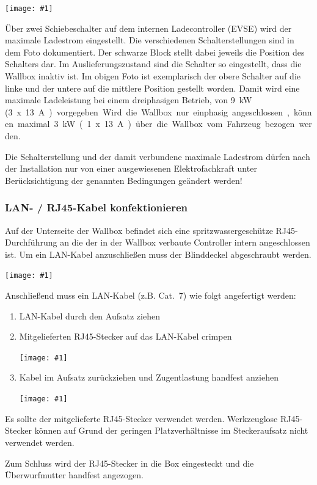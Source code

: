 \documentclass[a4paper,10pt]{article}
\newcommand{\hint}[1]{\begin{tcolorbox}[colback=boxgray,colframe=black,coltext=
white,title=Hinweis]#1\end{tcolorbox}}
\newcommand{\gfx}[1]{\texttt{[image: \#1]}}
\begin{document}
\begin{multicols*}{2}
	\gfx{./img_warp2/resized/warp2_current_configure_w_caption_600}

	Über zwei Schiebeschalter auf dem internen Ladecontroller (EVSE) wird der
	maximale Ladestrom eingestellt. Die verschiedenen Schalterstellungen sind in
	dem Foto dokumentiert. Der schwarze Block stellt dabei jeweils die Position
	des Schalters dar. Im Auslieferungszustand sind die Schalter so eingestellt,
	dass die Wallbox inaktiv ist. Im obigen Foto ist exemplarisch der obere
	Schalter auf die linke und der untere auf die mittlere Position gestellt
	worden. Damit wird eine maximale Ladeleistung bei einem dreiphasigen
	Betrieb, von \SI{9}{\kilo\watt} (\SI{3}x\SI{13}{\ampere}) vorgegeben. 
	Wird die Wallbox nur einphasig angeschlossen, können maximal 
	\SI{3}{\kilo\watt} (\SI{1}x\SI{13}{\ampere}) über die Wallbox vom Fahrzeug
	bezogen werden. 

	\hint{Die Schalterstellung und der damit verbundene maximale Ladestrom dürfen nach der
		Installation nur von einer ausgewiesenen Elektrofachkraft unter
		Berücksichtigung der genannten Bedingungen geändert werden!}

	\subsubsection{LAN- / RJ45-Kabel konfektionieren}\label{ethernet}

	Auf der Unterseite der Wallbox befindet sich eine spritzwassergeschütze RJ45-Durchführung
	an die der in der Wallbox verbaute Controller intern
	angeschlossen ist. Um ein LAN-Kabel anzuschließen muss der Blinddeckel
	abgeschraubt werden.

	\gfx{./img_warp2/resized/warp2_ethernet3_circle_600} %

	Anschließend muss ein LAN-Kabel (z.B. Cat.~7) wie folgt
	angefertigt werden:
	\begin{enumerate}
		\item LAN-Kabel durch den Aufsatz ziehen
		\item Mitgelieferten RJ45-Stecker auf das LAN-Kabel crimpen

		\gfx{./img_warp2/resized/warp2_rj45_1_600}
		\item Kabel im Aufsatz zurückziehen und Zugentlastung handfest anziehen

		\gfx{./img_warp2/resized/warp2_rj45_2_600}
	\end{enumerate}

	\hint{Es sollte der mitgelieferte RJ45-Stecker verwendet werden. Werkzeuglose RJ45-Stecker können auf Grund der geringen
	Platzverhältnisse im Steckeraufsatz nicht verwendet werden.}
	Zum Schluss wird der RJ45-Stecker in die Box eingesteckt und die Überwurfmutter
	handfest angezogen.


\end{multicols*}
\end{document}
